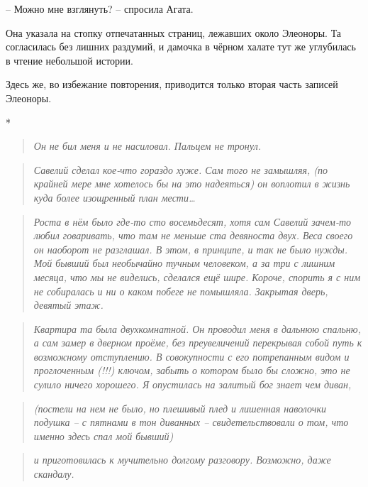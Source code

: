 \documentclass[
  a5paperpaper,
  DIV=11,
  numbers=noendperiod]{scrreprt}
\begin{document}

-- Можно мне взглянуть? -- спросила Агата.

Она указала на стопку отпечатанных страниц, лежавших около Элеоноры. Та
согласилась без лишних раздумий, и дамочка в чёрном халате тут же
углубилась в чтение небольшой истории.

Здесь же, во избежание повторения, приводится только вторая часть
записей Элеоноры.

*

\begin{quote}
\emph{Он не бил меня и не насиловал. Пальцем не тронул.}
\end{quote}

\begin{quote}
\emph{Савелий сделал кое-что гораздо хуже. Сам того не замышляя, (по
крайней мере мне хотелось бы на это надеяться) он воплотил в жизнь куда
более изощренный план мести\ldots{}}
\end{quote}

\begin{quote}
\emph{Роста в нём было где-то сто восемьдесят, хотя сам Савелий зачем-то
любил говаривать, что там не меньше ста девяноста двух. Веса своего он
наоборот не разглашал. В этом, в принципе, и так не было нужды. Мой
бывший был необычайно тучным человеком, а за три с лишним месяца, что мы
не виделись, сделался ещё шире. Короче, спорить я с ним не собиралась и
ни о каком побеге не помышляла. Закрытая дверь, девятый этаж.}
\end{quote}

\begin{quote}
\emph{Квартира та была двухкомнатной. Он проводил меня в дальнюю
спальню, а сам замер в дверном проёме, без преувеличений перекрывая
собой путь к возможному отступлению. В совокупности с его потрепанным
видом и проглоченным (!!!) ключом, забыть о котором было бы сложно, это
не сулило ничего хорошего. Я опустилась на залитый бог знает чем диван,}
\end{quote}

\begin{quote}
\emph{(постели на нем не было, но плешивый плед и лишенная наволочки
подушка -- с пятнами в тон диванных -- свидетельствовали о том, что
именно здесь спал мой бывший)}
\end{quote}

\begin{quote}
\emph{и приготовилась к мучительно долгому разговору. Возможно, даже
скандалу.}
\end{quote}
\end{document}
